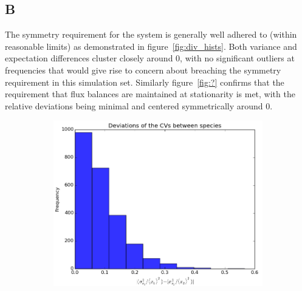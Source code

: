 \documentclass[a4paper,12pt]{article}
\begin{document}
\subsection*{B}
The symmetry requirement for the system is generally well adhered to (within reasonable limits) as demonstrated in figure~\ref{fig:div_hists}. Both variance and expectation differences cluster closely around 0, with no significant outliers at frequencies that would give rise to concern about breaching the symmetry requirement in this simulation set. Similarly figure~\ref{fig:?} confirms that the requirement that flux balances are maintained at stationarity is met, with the relative deviations being minimal and centered symmetrically around 0.
\begin{figure}[!ht]
        \centering
        \begin{subfigure}[!ht]{0.7\textwidth}
                \includegraphics[width=\textwidth]{images/vars_devs}
                \caption{}
                \label{fig:devs_vars}
        \end{subfigure}%
        

\end{figure}
\end{document}
